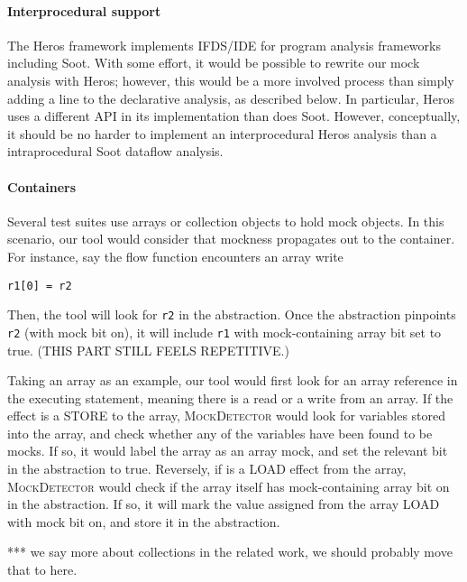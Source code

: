 \paragraph{Interprocedural support} The Heros framework\cite{bodden12:_inter_proced_data_flow_analy} implements IFDS/IDE for program analysis frameworks including Soot. With some effort, it would be possible to rewrite our mock analysis with Heros; however, this would be a more involved process than simply adding a line to the declarative analysis, as described below. In particular, Heros uses a different API in its implementation than does Soot. However, conceptually, it should be no harder to implement an interprocedural Heros analysis than a intraprocedural Soot dataflow analysis.

\paragraph{Containers} Several test suites use arrays or collection objects to hold mock objects. In this scenario, our tool would consider that mockness propagates out to the container. For instance, say the flow function encounters an array write \begin{lstlisting}[basicstyle=\ttfamily\small,numbers=none]
    r1[0] = r2
\end{lstlisting} 
Then, the tool will look for \texttt{r2} in the abstraction. Once the abstraction pinpoints \texttt{r2} (with mock bit on), it will include \texttt{r1} with mock-containing array bit set to true. (THIS PART STILL FEELS REPETITIVE.)


Taking an array as an example, our tool would first look for an array reference in the executing statement, meaning there is a read or a write from an array. If the effect is a STORE to the array, \textsc{MockDetector} would look for variables stored into the array, and check whether any of the variables have been found to be mocks. If so, it would label the array as an array mock, and set the relevant bit in the abstraction to true. Reversely, if is a LOAD effect from the array, \textsc{MockDetector} would check if the array itself has mock-containing array bit on in the abstraction. If so, it will mark the value assigned from the array LOAD with mock bit on, and store it in the abstraction.

*** we say more about collections in the related work, we should probably move that to here.

